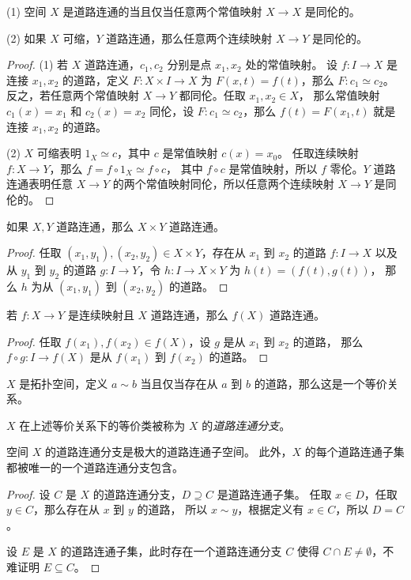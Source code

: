 \documentclass[fontset=none]{Notes}
\begin{document}
\begin{problem}{}{}
  (1) 空间 $X$ 是道路连通的当且仅当任意两个常值映射
    $X\to X$ 是同伦的。

  (2) 如果 $X$ 可缩，$Y$ 道路连通，那么任意两个连续映射 $X\to Y$
  是同伦的。
\end{problem}
\begin{proof}
  (1) 若 $X$ 道路连通，$c_1,c_2$ 分别是点 $x_1,x_2$ 处的常值映射。
  设 $f:I\to X$ 是连接 $x_1,x_2$ 的道路，定义 $F:X\times I\to X$
  为 $F(x,t)=f(t)$，那么 $F:c_1\simeq c_2$。
  反之，若任意两个常值映射 $X\to Y$ 都同伦。任取 $x_1,x_2\in X$，
  那么常值映射 $c_1(x)=x_1$ 和 $c_2(x)=x_2$ 同伦，设 
  $F:c_1\simeq c_2$，那么 $f(t)=F(x_1,t)$ 就是连接 $x_1,x_2$ 的道路。

  (2) $X$ 可缩表明 $1_X\simeq c$，其中 $c$ 是常值映射 $c(x)=x_0$。
  任取连续映射 $f:X\to Y$，那么 $f=f\circ 1_X\simeq f\circ c$，
  其中 $f\circ c$ 是常值映射，所以 $f$ 零伦。$Y$ 道路连通表明任意
  $X\to Y$ 的两个常值映射同伦，所以任意两个连续映射 $X\to Y$
  是同伦的。
\end{proof}

\begin{problem}{}{}
  如果 $X,Y$ 道路连通，那么 $X\times Y$ 道路连通。
\end{problem}
\begin{proof}
  任取 $(x_1,y_1),(x_2,y_2)\in X\times Y$，存在从 $x_1$
  到 $x_2$ 的道路 $f:I\to X$ 以及从 $y_1$ 到 $y_2$ 的道路
  $g:I\to Y$，令 $h:I\to X\times Y$ 为 $h(t)=(f(t),g(t))$，
  那么 $h$ 为从 $(x_1,y_1)$ 到 $(x_2,y_2)$ 的道路。
\end{proof}

\begin{problem}{}{}
  若 $f:X\to Y$ 是连续映射且 $X$ 道路连通，那么 $f(X)$ 道路连通。
\end{problem}
\begin{proof}
  任取 $f(x_1),f(x_2)\in f(X)$，设 $g$ 是从 $x_1$ 到 $x_2$ 的道路，
  那么 $f\circ g:I\to f(X)$ 是从 $f(x_1)$ 到 $f(x_2)$ 的道路。
\end{proof}

\begin{theorem}
  $X$ 是拓扑空间，定义 $a\sim b$ 当且仅当存在从 $a$ 到 $b$
  的道路，那么这是一个等价关系。
\end{theorem}

\begin{definition}
  $X$ 在上述等价关系下的等价类被称为 $X$ 的\emph{道路连通分支}。 
\end{definition}

\begin{problem}{}{}
  空间 $X$ 的道路连通分支是极大的道路连通子空间。
  此外，$X$ 的每个道路连通子集都被唯一的一个道路连通分支包含。
\end{problem}
\begin{proof}
  设 $C$ 是 $X$ 的道路连通分支，$D\supseteq C$ 是道路连通子集。
  任取 $x\in D$，任取 $y\in C$，那么存在从 $x$ 到 $y$ 的道路，
  所以 $x\sim y$，根据定义有 $x\in C$，所以 $D=C$。
  
  设 $E$ 是 $X$ 的道路连通子集，此时存在一个道路连通分支 $C$
  使得 $C\cap E\neq\emptyset$，不难证明 $E\subseteq C$。
\end{proof}
\end{document}
